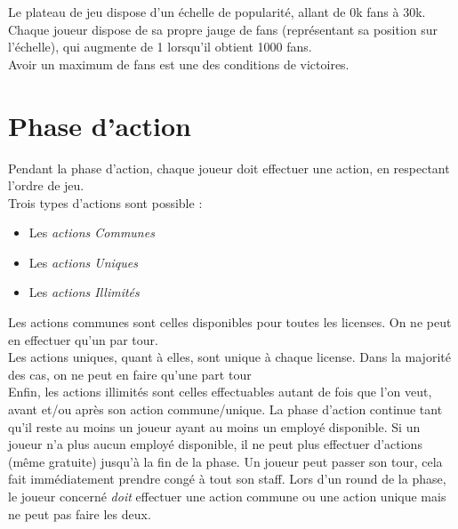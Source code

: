             Le plateau de jeu dispose d'un échelle de popularité, allant de 0k fans à 30k.
            Chaque joueur dispose de sa propre jauge de fans (représentant sa position sur l'échelle),
            qui augmente de 1 lorsqu'il obtient 1000 fans.
            \\
            Avoir un maximum de fans est une des conditions de victoires.



        \section{Phase d'action}

            Pendant la phase d'action, chaque joueur doit effectuer une action, en respectant l'ordre de jeu.
            \\
            Trois types d'actions sont possible :
            \begin{itemize}
                \item Les \textit{actions Communes}
                \item Les \textit{actions Uniques}
                \item Les \textit{actions Illimités}
            \end{itemize}

            Les actions communes sont celles disponibles pour toutes les licenses.
            On ne peut en effectuer qu'un par tour.
            \\
            Les actions uniques, quant à elles, sont unique à chaque license.
            Dans la majorité des cas, on ne peut en faire qu'une part tour
            \\
            Enfin, les actions illimités sont celles effectuables autant de fois que
            l'on veut, avant et/ou après son action commune/unique.
            \newline
            La phase d'action continue tant qu'il reste au moins un joueur ayant au moins un employé disponible.
            Si un joueur n'a plus aucun employé disponible, il ne peut plus effectuer d'actions (même gratuite)
            jusqu'à la fin de la phase.
            Un joueur peut passer son tour, cela fait immédiatement prendre congé à tout son staff.
            \newline
            Lors d'un round de la phase, le joueur concerné \emph{doit} effectuer une action commune
            ou une action unique mais ne peut pas faire les deux.

